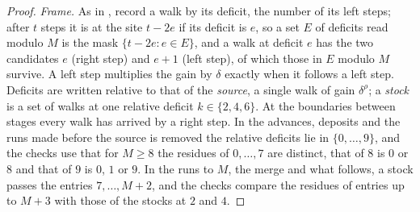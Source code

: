\begin{proof}
\emph{Frame.} As in \cite{dgone}, record a walk by its deficit, the number of its left steps; after $t$ steps it is at the site $t-2e$ if its deficit is $e$, so a set $E$ of deficits read modulo $M$ is the mask $\{t-2e:e\in E\}$, and a walk at deficit $e$ has the two candidates $e$ (right step) and $e+1$ (left step), of which those in $E$ modulo $M$ survive. A left step multiplies the gain by $\delta$ exactly when it follows a left step. Deficits are written relative to that of the \emph{source}, a single walk of gain $\delta^{\rho}$; a \emph{stock} is a set of walks at one relative deficit $k\in\{2,4,6\}$. At the boundaries between stages every walk has arrived by a right step. In the advances, deposits and the runs made before the source is removed the relative deficits lie in $\{0,\dots,9\}$, and the checks use that for $M\ge8$ the residues of $0,\dots,7$ are distinct, that of $8$ is $0$ or $8$ and that of $9$ is $0$, $1$ or $9$. In the runs to $M$, the merge and what follows, a stock passes the entries $7,\dots,M+2$, and the checks compare the residues of entries up to $M+3$ with those of the stocks at $2$ and $4$.


\end{proof}

